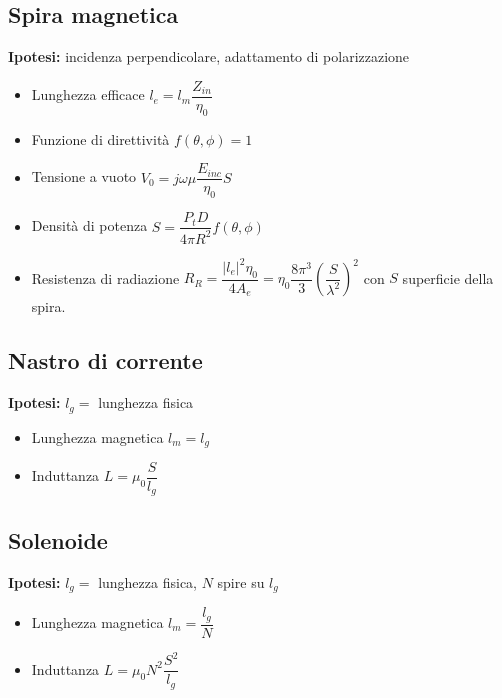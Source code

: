 \documentclass{article}
\begin{document}
\subsection{Spira magnetica}
\textbf{Ipotesi:} incidenza perpendicolare, adattamento di polarizzazione
\begin{itemize}
	\item Lunghezza efficace \(l_e = l_m \dfrac{Z_{in}}{\eta_0}\)
	\item Funzione di direttività \(f(\theta, \phi) = 1 \)
	\item Tensione a vuoto \( V_0 = j \omega \mu \dfrac{E_{inc}}{\eta_0} S \) 
	\item Densità di potenza \( S = \dfrac{P_t D}{4 \pi R^2} f(\theta, \phi) \)
	\item Resistenza di radiazione \( R_R = \dfrac{|l_e|^2 \eta_0}{4 A_e} = \eta_0 \dfrac{8 \pi^3}{3}\left( \dfrac{S}{\lambda^2} \right) ^ 2 \) con \(S\) superficie della spira.
\end{itemize}

\subsection{Nastro di corrente}
\textbf{Ipotesi:} \(l_g = \) lunghezza fisica 
\begin{itemize}
	\item Lunghezza magnetica \( l_m = l_g \)
	\item Induttanza \( L = \mu_0 \dfrac{S}{l_g} \)
\end{itemize}

\subsection{Solenoide}
\textbf{Ipotesi:} \(l_g = \) lunghezza fisica, \(N\) spire su \(l_g\) 
\begin{itemize}
	\item Lunghezza magnetica \(l_m = \dfrac{l_g}{N} \)
	\item Induttanza \( L = \mu_0 N^2 \dfrac{S^2}{l_g} \)
\end{itemize}
\end{document}
